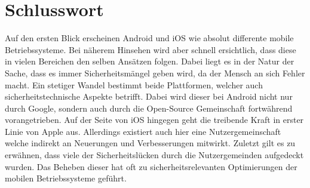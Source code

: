 \section{Schlusswort}
	Auf den ersten Blick erscheinen Android und iOS wie absolut differente mobile
	Betriebssysteme. Bei näherem Hinsehen wird aber schnell ersichtlich, dass diese
	in vielen Bereichen den selben Ansätzen folgen. Dabei liegt es in der Natur der
	Sache, dass es immer Sicherheitsmängel geben wird, da der Mensch an sich Fehler macht. 
	Ein stetiger Wandel bestimmt beide Plattformen, welcher auch
	sicherheitstechnische Aspekte betrifft. Dabei wird dieser bei Android nicht nur
	durch Google, sondern auch durch die Open-Source Gemeinschaft fortwährend
	vorangetrieben. Auf der Seite von iOS hingegen geht die treibende Kraft in
	erster Linie von Apple aus. Allerdings existiert auch hier eine
	Nutzergemeinschaft welche indirekt an Neuerungen und Verbesserungen mitwirkt.
	Zuletzt gilt es zu erwähnen, dass viele der Sicherheitslücken durch die
	Nutzergemeinden aufgedeckt wurden. Das Beheben dieser hat oft zu
	sicherheitsrelevanten Optimierungen der mobilen Betriebssysteme geführt.